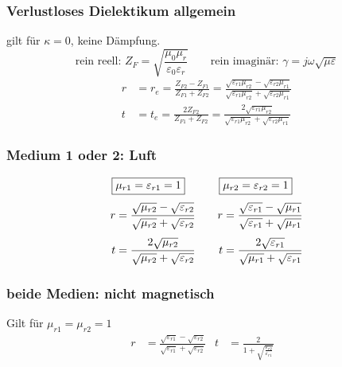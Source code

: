 \subsubsection[Senkrechter Einfall ideales/verlustl. Dielekt.]{Verlustloses Dielektikum allgemein}
gilt für $ \kappa =0 $, keine Dämpfung.
\[ \text{rein reell: }Z_F=  \sqrt{\frac{\mu_0\mu_r}{\varepsilon_0\varepsilon_r}}  \qquad
	\text{rein imaginär: }\gamma  = j \omega\sqrt{\mu\varepsilon} \]
\begin{align*}
	r & = r_e =\frac{Z_{F2} - Z_{F1}}{Z_{F1} + Z_{F2}} = \frac{\sqrt{\varepsilon_{r1}\mu_{r2}} - \sqrt{\varepsilon_{r2}\mu_{r1}} }{\sqrt{\varepsilon_{r1}\mu_{r2}}+{\sqrt{\varepsilon_{r2}\mu_{r1}}}} \\
	t & = t_e = \frac{2 Z_{F2}}{Z_{F1} + Z_{F2}} = \frac{2\sqrt{\varepsilon_{r1}\mu_{r2}}}{\sqrt{\varepsilon_{r1}\mu_{r2}}+\sqrt{\varepsilon_{r2}\mu_{r1}}}
\end{align*}

\subsubsection{Medium 1 oder 2: Luft}
\begin{equation*}
	\setlength{\jot}{6pt}
	\begin{aligned}[t]
		\Aboxed{ & \mu_{r1} = \varepsilon_{r1} = 1}                                                            \\
		r        & = \frac{\sqrt{\mu_{r2}}-\sqrt{\varepsilon_{r2}}}{{\sqrt{\mu_{r2}}+\sqrt{\varepsilon_{r2}}}} \\
		t        & = \frac{2\sqrt{\mu_{r2}}}{\sqrt{\mu_{r2}}+\sqrt{\varepsilon_{r2}}}
	\end{aligned}
	\qquad
	\begin{aligned}[t]
		\Aboxed{ & \mu_{r2} = \varepsilon_{r2} = 1}                                                            \\
		r        & = \frac{\sqrt{\varepsilon_{r1}}-\sqrt{\mu_{r1}}}{{\sqrt{\varepsilon_{r1}}+\sqrt{\mu_{r1}}}} \\
		t        & = \frac{2\sqrt{\varepsilon_{r1}}}{\sqrt{\mu_{r1}}+\sqrt{\varepsilon_{r1}}}
	\end{aligned}
\end{equation*}

\subsubsection{beide Medien: nicht magnetisch}
Gilt für $\mu_{r1} = \mu_{r2} = 1$
\begin{align*}
	r & = \frac{\sqrt{\varepsilon_{r1}}-\sqrt{\varepsilon_{r2}}}{{\sqrt{\varepsilon_{r1}}+\sqrt{\varepsilon_{r2}}}} &
	t & = \frac{2}{1+\sqrt{\frac{\varepsilon_{r2}}{\varepsilon_{r1}}}}                                              &
\end{align*}

